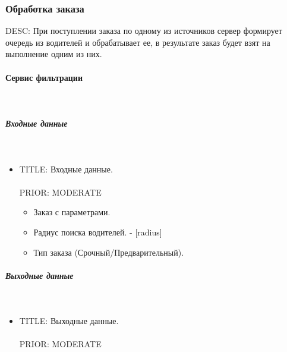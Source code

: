   \subsubsection{Обработка заказа} \label{selection_drivers_for_the_order}

    DESC:  При поступлении заказа по одному из источников сервер формирует очередь из водителей и обрабатывает ее, в результате заказ будет взят на выполнение одним из них. 

    \paragraph{Сервис фильтрации} \mbox{} \\ \label{driver_filters_taxi_service}

      \subparagraph{Входные данные} \mbox{} \\ \label{driver_filters_taxi_service_input_data}

        \begin{itemize}

          \item{

            TITLE: Входные данные.\\
            \\
            PRIOR: MODERATE\\

          }

          \begin{itemize}
            \item Заказ с параметрами.
            \item Радиус поиска водителей. - [radius]
            \item Тип заказа (Срочный/Предварительный).
          \end{itemize}

        \end{itemize}

      \subparagraph{Выходные данные} \mbox{} \\

        \begin{itemize}

          \item{

            TITLE: Выходные данные.\\
            \\
            PRIOR: MODERATE\\

          }

        \end{itemize}

